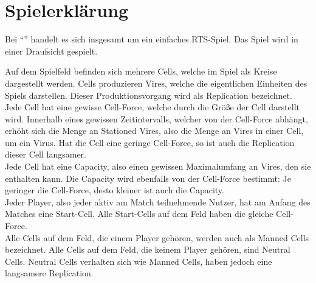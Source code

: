 \section{Spielerklärung}
\label{sec:spielerklaerung}

Bei ``\vires'' handelt es sich insgesamt um ein einfaches RTS-Spiel. 
Das Spiel wird in einer Draufsicht gespielt.

Auf dem Spielfeld befinden sich mehrere Cells, welche im Spiel als Kreise dargestellt werden.
Cells produzieren Vires, welche die eigentlichen Einheiten des Spiels darstellen. Dieser Produktionsvorgang wird als Replication bezeichnet. \\
Jede Cell hat eine gewisse Cell-Force, welche durch die Größe der Cell darstellt wird.
Innerhalb eines gewissen Zeitintervalls, welcher von der Cell-Force abhängt, erhöht sich die Menge an Stationed Vires, also die Menge an Vires in einer Cell, um ein Virus.
Hat die Cell eine geringe Cell-Force, so ist auch die Replication dieser Cell langsamer. \\
Jede Cell hat eine Capacity, also einen gewissen Maximalumfang an Vires, den sie enthalten kann.
Die Capacity wird ebenfalls von der Cell-Force bestimmt: Je geringer die Cell-Force, desto kleiner ist auch die Capacity. \\
Jeder Player, also jeder aktiv am Match teilnehmende Nutzer, hat am Anfang des Matches eine Start-Cell. 
Alle Start-Cells auf dem Feld haben die gleiche Cell-Force. \\
Alle Cells auf dem Feld, die einem Player gehören, werden auch als Manned Cells bezeichnet.
Alle Cells auf dem Feld, die keinem Player gehören, sind Neutral Cells. Neutral Cells verhalten sich wie Manned Cells, haben jedoch eine langsamere Replication.

